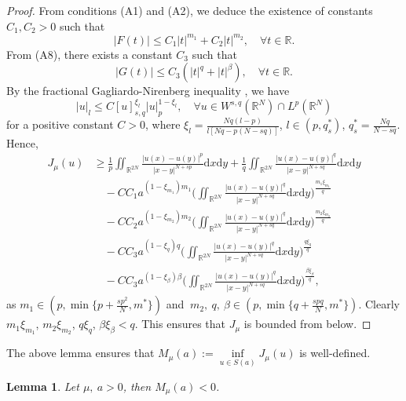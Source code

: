 \documentclass[10pt,a4paper]{amsart}
\numberwithin{equation}{section}
\newtheorem{lemma}[theorem]{Lemma}
\begin{document}
\begin{proof}
From  conditions (A1) and (A2), we deduce the existence of constants
$C_1, C_2>0$ such that
$$
|F(t)|\le C_1|t|^{m_1}+C_2|t|^{m_2},\quad\forall t\in\mathbb{R}.
$$
From (A8), there exists a constant $C_3$ such that
$$
|G(t)|\le C_3(|t|^{q}+|t|^{\beta}),\quad\forall t\in\mathbb{R}.
$$
By the fractional Gagliardo-Nirenberg inequality \cite{ref24}, we have
\begin{equation}\label{eqn-(2.2)}
|u|_l\le C[u]_{{s,q}}^{\xi_{l}}|u|_p^{1-\xi_{l}},\quad 
\forall u\in W^{s,q}(\mathbb {R}^N)\cap L^{p}(\mathbb {R}^N)
\end{equation}
for a positive constant $C>0$, where $\xi_{l}=\frac{Nq(l-p)}{l[Nq-p(N-sq)]}$,
$l\in(p,q_{s}^{*})$, $q_{s}^{*}=\frac{Nq}{N-sq}$. Hence,
\begin{equation}\label{eqn-(2.3)}
\begin{aligned}
J_\mu(u)
&\geq \frac{1}{p}\iint_{\mathbb{R}^{2N}}\frac{|u(x)-u(y)|^p}{|x-y|^{N+sp}}
 \mathrm{d}x\mathrm{d}y
 +\frac{1}{q}\iint_{\mathbb{R}^{2N}}\frac{|u(x)-u(y)|^q}{|x-y|^{N+sq}}\mathrm{d}x
 \mathrm{d}y\\
&\quad -CC_1a^{(1-\xi_{m_1})m_1}
 \Big(\iint_{\mathbb{R}^{2N}}\frac{|u(x)-u(y)|^q}{|x-y|^{N+sq}}\mathrm{d}x\mathrm{d}y
 \Big)^{\frac{m_1\xi_{m_1}}{q}}\\
&\quad -CC_2a^{(1-\xi_{m_2})m_{2}}
 \big(\iint_{\mathbb{R}^{2N}}\frac{|u(x)-u(y)|^q}{|x-y|^{N+sq}}\mathrm{d}x\mathrm{d}y
 \Big)^{\frac{m_2\xi_{m_2}}{q}}\\
&\quad -CC_3a^{(1-\xi_{q})q}
 \Big(\iint_{\mathbb{R}^{2N}}\frac{|u(x)-u(y)|^q}{|x-y|^{N+sq}}\mathrm{d}x\mathrm{d}y
 \Big)^{\frac{q\xi_{q}}{q}}\\
&\quad -CC_3a^{(1-\xi_{\beta})\beta}
 \Big(\iint_{\mathbb{R}^{2N}}\frac{|u(x)-u(y)|^q}{|x-y|^{N+sq}}\mathrm{d}x\mathrm{d}y
 \big)^{\frac{\beta\xi_{\beta}}{q}},
\end{aligned}
\end{equation}
as $m_1\in(p,\min\{p+\frac{sp^2}{N},m^{*}\})$ and 
$~m_2,~q,~\beta\in(p,\min\{q+\frac{spq}{N},m^{*}\})$. 
Clearly $m_1\xi_{m_1}$, $m_2\xi_{m_2}$, $q\xi_{q}$, $\beta\xi_{\beta}<q$. 
This ensures that $J_\mu$ is bounded from below.
\end{proof}

The above lemma ensures that $M_\mu(a):=\underset{u\in S(a)}\inf J_\mu(u)$ is 
well-defined.

\begin{lemma}\label{lem:2.2} 
Let $\mu,~a>0$, then $M_\mu(a)<0$.
\end{lemma}
\end{document}
